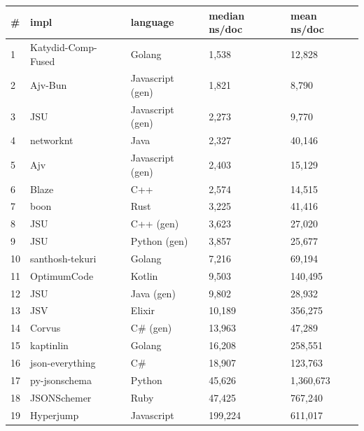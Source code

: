 \begin{tabular}{ll|l|ll}
\# & impl & language & median ns/doc & mean ns/doc \\
\hline
1 & Katydid-Comp-Fused & Golang & 1,538 & 12,828 \\
2 & Ajv-Bun & Javascript (gen) & 1,821 & 8,790 \\
3 & JSU & Javascript (gen) & 2,273 & 9,770 \\
4 & networknt & Java & 2,327 & 40,146 \\
5 & Ajv & Javascript (gen) & 2,403 & 15,129 \\
6 & Blaze & C++ & 2,574 & 14,515 \\
7 & boon & Rust & 3,225 & 41,416 \\
8 & JSU & C++ (gen) & 3,623 & 27,020 \\
9 & JSU & Python (gen) & 3,857 & 25,677 \\
10 & santhosh-tekuri & Golang & 7,216 & 69,194 \\
11 & OptimumCode & Kotlin & 9,503 & 140,495 \\
12 & JSU & Java (gen) & 9,802 & 28,932 \\
13 & JSV & Elixir & 10,189 & 356,275 \\
14 & Corvus & C\# (gen) & 13,963 & 47,289 \\
15 & kaptinlin & Golang & 16,208 & 258,551 \\
16 & json-everything & C\# & 18,907 & 123,763 \\
17 & py-jsonschema & Python & 45,626 & 1,360,673 \\
18 & JSONSchemer & Ruby & 47,425 & 767,240 \\
19 & Hyperjump & Javascript & 199,224 & 611,017 \\
\end{tabular}
